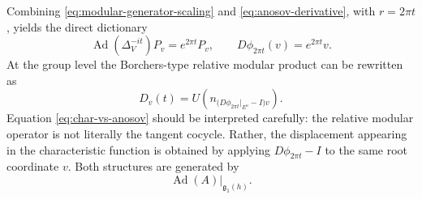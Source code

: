 \documentclass[a4paper,11pt]{article}
\theoremstyle{definition}
\newcommand{\Ad}{\operatorname{Ad}}
\begin{document}
Combining \eqref{eq:modular-generator-scaling} and
\eqref{eq:anosov-derivative}, with \(r=2\pi t\), yields the direct dictionary
\begin{equation}
\Ad(\Delta_V^{-it})P_v=e^{2\pi t}P_v,
\qquad
D\phi_{2\pi t}(v)=e^{2\pi t}v.
\label{eq:dictionary}
\end{equation}
At the group level the Borchers-type relative modular product can be rewritten as
\begin{equation}
D_v(t)
=
U\!\left(
n_{\bigl(D\phi_{2\pi t}|_{E^u}-I\bigr)v}
\right).
\label{eq:char-vs-anosov}
\end{equation}
Equation \eqref{eq:char-vs-anosov} should be interpreted carefully: the relative modular
operator is not literally the tangent cocycle.  Rather, the displacement appearing in
the characteristic function is obtained by applying \(D\phi_{2\pi t}-I\) to the same
root coordinate \(v\).  Both structures are generated by
\[
\Ad(A)|_{\mathfrak g_1(h)}.
\]
\end{document}
